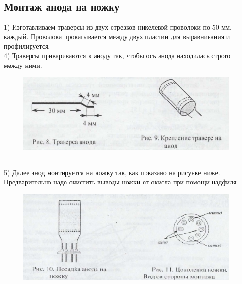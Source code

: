 \documentclass[11pt]{article}
\begin{document}
\subsection{Монтаж анода на ножку}
    1) Изготавливаем траверсы из двух отрезков никелевой проволоки по $50$ мм. каждый. Проволока прокатывается между двух пластин для выравнивания и профилируется.\\
    4) Траверсы привариваются к аноду так, чтобы ось анода находилась строго между ними.\\
\begin{figure}[h]
\begin{center}
\includegraphics[width=13cm]{траверса анода.jpg}
\end{center}
\end{figure}\\
    5) Далее анод монтируется на ножку так, как показано на рисунке ниже. Предварительно надо очистить выводы ножки от окисла при помощи надфиля.\\
\begin{figure}[h]
\begin{center}
\includegraphics[width=13cm]{посадка на ножку.jpg}
\end{center}
\end{figure}
\newpage
\end{document}
